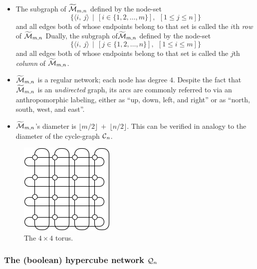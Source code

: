 \begin{itemize}
  \begin{itemize}
  \item
The subgraph of $\widetilde{\mbox{$\cal M$}}_{m,n}$ defined by the node-set
\[ \{ \langle i, \ j \rangle  \ \ | \ \ \left[i \in \{1, 2, \ldots,
  m\}\right], \ \ \left[1 \leq j \leq n\right]\}
\]
and all edges both of whose endpoints belong to that set is called the
$i$th {\it row} of $\widetilde{\mbox{$\cal M$}}_{m,n}$
Dually, the subgraph of$\widetilde{\mbox{$\cal M$}}_{m,n}$ defined by the node-set
\[ \{ \langle i, \ j \rangle  \ \ | \ \ \left[j \in \{1, 2, \ldots,
  n\}\right], \ \ \left[1 \leq i \leq m\right] \}
\]
and all edges both of whose endpoints belong to that set is called the
$j$th {\it column} of $\widetilde{\mbox{$\cal M$}}_{m,n}$.
  \item
$\widetilde{\mbox{$\cal M$}}_{m,n}$ is a regular network; each node has degree $4$.
    Despite the fact that $\widetilde{\mbox{$\cal M$}}_{m,n}$ is an {\em
      undirected} graph, its arcs are commonly referred to via an
    anthropomorphic labeling, either as ``up, down, left, and right''
    or as ``north, south, west, and east''.
  \item {}
$\widetilde{\mbox{$\cal M$}}_{m,n}$'s diameter is $\lfloor m/2 \rfloor \ + \
\lfloor n/2 \rfloor$.  This can be verified in analogy to the diameter
of the cycle-graph $\mbox{$\cal C$}_n$.
  \end{itemize}
\end{itemize}

\begin{figure}[hbt]
\begin{center}
       \includegraphics[scale=0.6]{FiguresGraph/torus}
       \caption{The $4 \times 4$ torus.}
  \label{fig:torus}
\end{center}
\end{figure}

\subsubsection{The (boolean) hypercube network $\mbox{$\cal Q$}_n$}

